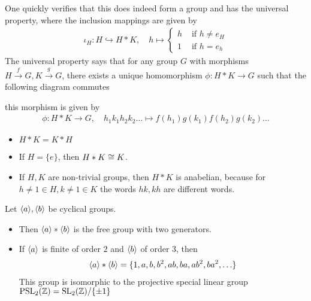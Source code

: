 One quickly verifies that this does indeed form a group and has the universal property, where the inclusion mappings are given by
\begin{align*}
  \iota_H: H \hookrightarrow H \ast K, 
  \quad h \mapsto  \left\{\begin{array}{ll}
    h & \text{ if } h \neq e_H\\
    1 & \text{ if } h = e_h
  \end{array} \right.
\end{align*}
The universal property says that for any group $G$ with morphisms $H \stackrel{f}{\to} G, K \stackrel{g}{\to}G$, there exists a unique homomorphism $\phi: H \ast K \to G$ such that the following diagram commutes
\begin{center}
\end{center}
this morphism is given by
\begin{align*}
  \phi: H \ast K \to G, \quad h_1 k_1h_2k_2 \ldots \mapsto f(h_1)g(k_1)f(h_2)g(k_2)\ldots
\end{align*}


\begin{itemize}
  \item $H \ast K = K \ast H$
  \item If $H = \{e\}$, then $H \ast K \cong K$.
  \item If $H,K$ are non-trivial groups, then $H \ast K$ is anabelian, because for $h \neq 1 \in H, k \neq 1 \in K$ the words $hk, kh$ are different words.
\end{itemize}

\begin{ex}[]
  Let $\langle a\rangle, \langle b\rangle$ be cyclical groups. 

  \begin{itemize}
    \item Then $\langle a\rangle \ast \langle b\rangle$ is the free group with two generators. 
    \item If $\langle a\rangle$ is finite of order $2$ and $\langle b\rangle$ of order $3$, then 
      \begin{align*}
        \langle a\rangle \ast \langle b\rangle = \{1,a,b,b^{2},ab,ba,ab^{2},ba^{2}, \ldots\}
      \end{align*}
      This group is isomorphic to the projective special linear group $\text{PSL}_2(\mathbb{Z}) = \text{SL}_2(\mathbb{Z})/\{\pm 1\}$
  \end{itemize}
\end{ex}

